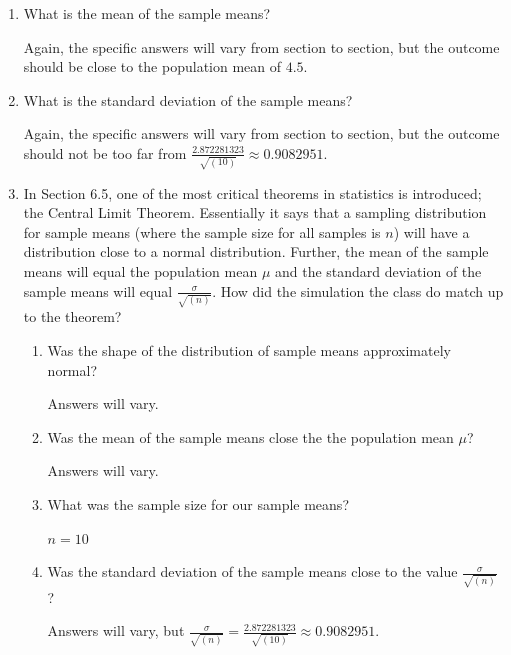 \documentclass{article}
\newcommand{\answer}[1]{\color{red}#1}
\begin{document}
\begin{enumerate}
\begin{enumerate}
{\answer This will certainly vary from section to section, but the distributions should be roughly single-mound, symmetric.
} 

\item What is the mean of the sample means? 

{\answer Again, the specific answers will vary from section to section, but the outcome should be close to the population mean of $4.5$.
} 

\item What is the standard deviation of the sample means? 

{\answer Again, the specific answers will vary from section to section, but the outcome should not be too far from $\frac{2.872281323}{\sqrt{(10)}} \approx 0.9082951$.
} 

\item In Section 6.5, one of the most critical theorems in statistics is introduced; the Central Limit Theorem. Essentially it says that a sampling distribution for sample means (where the sample size for all samples is $n$) will have a distribution close to a normal distribution. Further, the mean of the sample means will equal the population mean $\mu$ and the standard deviation of the sample means will equal $\frac{\sigma}{\sqrt{(n)}}$. How did the simulation the class do match up to the theorem? 

	\begin{enumerate}
	
	\item Was the shape of the distribution of sample means approximately normal? 
	
	{\answer Answers will vary.
	} 
	
	\item Was the mean of the sample means close the the population mean $\mu$? 
	
	{\answer Answers will vary.
	} 
	
	\item What was the sample size for our sample means? 
	
	{\answer $n = 10$ 
	} 
	
	\item Was the standard deviation of the sample means close to the value $\frac{\sigma}{\sqrt{(n)}}$? 
	
	{\answer Answers will vary, but $\frac{\sigma}{\sqrt{(n)}} = \frac{2.872281323}{\sqrt{(10)}} \approx 0.9082951$.
	} 
	
	\end{enumerate}
	


\end{enumerate}
\end{enumerate}
\end{document}
